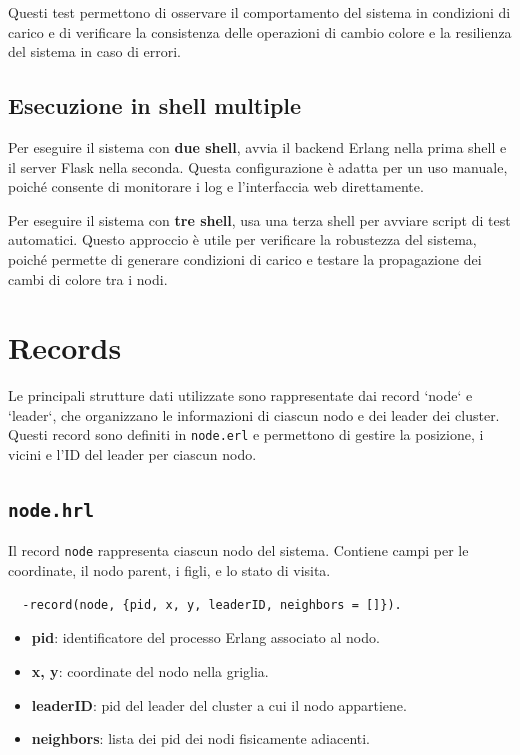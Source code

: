 \documentclass[12pt, a4paper]{report}
\begin{document}
\noindent Questi test permettono di osservare il comportamento del sistema in condizioni di carico e di verificare la consistenza delle operazioni di cambio colore e la resilienza del sistema in caso di errori.

\subsection{Esecuzione in shell multiple}
Per eseguire il sistema con \textbf{due shell}, avvia il backend Erlang nella prima shell e il server Flask nella seconda. Questa configurazione è adatta per un uso manuale, poiché consente di monitorare i log e l’interfaccia web direttamente.

Per eseguire il sistema con \textbf{tre shell}, usa una terza shell per avviare script di test automatici. Questo approccio è utile per verificare la robustezza del sistema, poiché permette di generare condizioni di carico e testare la propagazione dei cambi di colore tra i nodi.

\section{Records}

Le principali strutture dati utilizzate sono rappresentate dai record `node` e `leader`, che organizzano le informazioni di ciascun nodo e dei leader dei cluster. Questi record sono definiti in \texttt{node.erl} e permettono di gestire la posizione, i vicini e l'ID del leader per ciascun nodo.

\subsection{\texttt{node.hrl}}

Il record \texttt{node} rappresenta ciascun nodo del sistema. Contiene campi per le coordinate, il nodo parent, i figli, e lo stato di visita.

\begin{tcolorbox}[title=Definizione del record \texttt{node}]
\begin{verbatim}
  -record(node, {pid, x, y, leaderID, neighbors = []}).
\end{verbatim}
\end{tcolorbox}

\begin{itemize}
    \item \textbf{pid}: identificatore del processo Erlang associato al nodo.
    \item \textbf{x, y}: coordinate del nodo nella griglia.
    \item \textbf{leaderID}: pid del leader del cluster a cui il nodo appartiene.
    \item \textbf{neighbors}: lista dei pid dei nodi fisicamente adiacenti.
\end{itemize}
\end{document}
